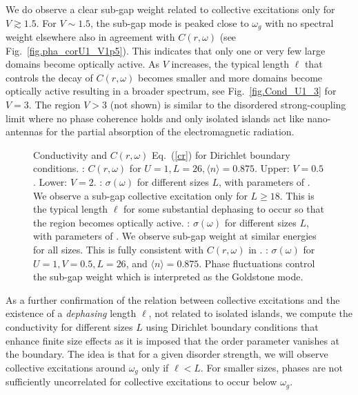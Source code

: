 \documentclass[Collective.tex]{revtex4-1}
\begin{document}
We do observe a clear sub-gap weight related to collective excitations only for $V \gtrsim 1.5$. For $V \sim 1.5$, the sub-gap mode is peaked close to $\omega_g$ with no spectral weight elsewhere also in  agreement with $C(r,\omega)$ (see Fig.~\ref{fig.pha_corU1_V1p5}).
This indicates that only one or very few large domains become optically active. As $V$ increases, the typical length $\ell$ that controls the decay of $C(r,\omega)$ becomes smaller and more domains become optically active resulting in a broader spectrum, see Fig.~\ref{fig.Cond_U1_3} for $V=3$. The region $V>3$ (not shown) is similar to the disordered strong-coupling limit where no phase coherence holds and only isolated islands act like nano-antennas for the partial absorption of the electromagnetic radiation. 
\begin{figure}
		\caption{Conductivity and $C(r,\omega)$ Eq.~(\ref{cr}) for Dirichlet boundary conditions. : $C(r,\omega)$ for $U=1, L=26, \langle n \rangle =0.875$. Upper: $V=0.5$. Lower: $V=2$. : $\sigma(\omega)$ for different sizes $L$, with parameters of . We observe a sub-gap collective excitation only for $L \geq 18$. This is the typical length $\ell$ for some substantial dephasing to occur so that the region becomes optically active. : $\sigma(\omega)$ for different sizes $L$, with parameters of . We observe sub-gap weight at similar energies for all sizes. This is fully consistent with $C(r,\omega)$ in . : $\sigma(\omega)$ for $U=1, V = 0.5, L=26$, and $ \langle n \rangle =0.875$. Phase fluctuations control the sub-gap weight which is interpreted as the Goldstone mode.}\label{Fig.U1_cond_L}
\end{figure}
As a further confirmation of the relation between collective excitations and the existence of a {\it dephasing} length $\ell$, not related to isolated islands, we compute the conductivity for different sizes $L$  using Dirichlet boundary conditions that enhance finite size effects as it is imposed that the order parameter vanishes at the boundary. The idea is that for a given disorder strength, we will observe collective excitations around $\omega_g$ only if $\ell < L$. For smaller sizes, phases are not sufficiently uncorrelated for collective excitations to occur below $\omega_g$.   
\end{document}
